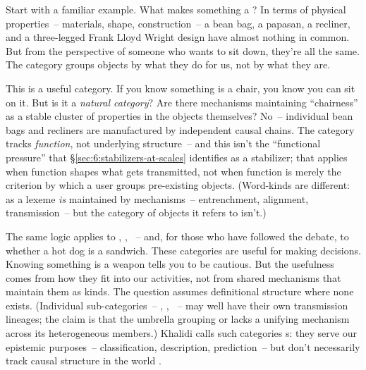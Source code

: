 Start with a familiar example. What makes something a ? In terms of physical properties~-- materials, shape, construction~-- a bean bag, a papasan, a recliner, and a three-legged Frank Lloyd Wright design have almost nothing in common. But from the perspective of someone who wants to sit down, they're all the same. The category  groups objects by what they do for us, not by what they are.

This is a useful category. If you know something is a chair, you know you can sit on it. But is it a \emph{natural category}? Are there mechanisms maintaining \enquote{chairness} as a stable cluster of properties in the objects themselves? No~-- individual bean bags and recliners are manufactured by independent causal chains. The category tracks \emph{function}, not underlying structure~-- and this isn't the \enquote{functional pressure} that §\ref{sec:6:stabilizers-at-scales} identifies as a stabilizer; that applies when function shapes what gets transmitted, not when function is merely the criterion by which a user groups pre-existing objects. (Word-kinds are different:  as a lexeme \emph{is} maintained by mechanisms~-- entrenchment, alignment, transmission~-- but the category of objects it refers to isn't.)

The same logic applies to , , ~-- and, for those who have followed the debate, to whether a hot dog is a sandwich. These categories are useful for making decisions. Knowing something is a weapon tells you to be cautious. But the usefulness comes from how they fit into our activities, not from shared mechanisms that maintain them as kinds. The question assumes definitional structure where none exists. (Individual sub-categories~-- , , ~-- may well have their own transmission lineages; the claim is that the umbrella grouping  or  lacks a unifying mechanism across its heterogeneous members.) Khalidi calls such categories s: they serve our epistemic purposes~-- classification, description, prediction~-- but don't necessarily track causal structure in the world \autocite[43, 65]{khalidi2013}.

